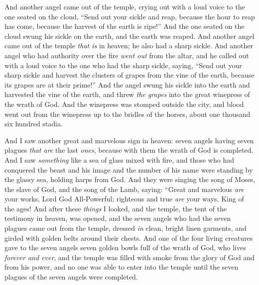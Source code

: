 \begin{biblechapter}
\verse And another angel came out of the temple, crying out with a loud voice to the one seated on the cloud, “Send out your sickle and reap, because the hour to reap has come, because the harvest of the earth is ripe!”
\verse And the one seated on the cloud swung his sickle on the earth, and the earth was reaped.
\verse And another angel came out of the temple \textit{that is} in heaven; he also had a sharp sickle.
\verse And another angel who had authority over the fire \textit{went out} from the altar, and he called out with a loud voice to the one who had the sharp sickle, saying, “Send out your sharp sickle and harvest the clusters of grapes from the vine of the earth, because its grapes are at their prime!”
\verse And the angel swung his sickle into the earth and harvested the vine of the earth, and threw \textit{the grapes} into the great winepress of the wrath of God.
\verse And the winepress was stomped outside the city, and blood went out from the winepress up to the bridles of the horses, about one thousand six hundred stadia.
\end{biblechapter}

\begin{biblechapter} %
 And I saw another great and marvelous sign in heaven: seven angels having seven plagues \textit{that are} the last \textit{ones}, because with them the wrath of God is completed.
\verse And I saw \textit{something} like a sea of glass mixed with fire, and those who had conquered the beast and his image and the number of his name were standing by the glassy sea, holding harps from God.
\verse And they were singing the song of Moses, the slave of God, and the song of the Lamb, saying:
\verse “Great and marvelous \textit{are} your works, 
Lord God All-Powerful; 
righteous and true \textit{are} your ways, 
King of the ages!
\verse And after these \textit{things} I looked, and the temple, the tent of the testimony in heaven, was opened,
\verse and the seven angels who had the seven plagues came out from the temple, dressed \textit{in} clean, bright linen garments, and girded with golden belts around their chests.
\verse And one of the four living creatures gave to the seven angels seven golden bowls full of the wrath of God, who lives \textit{forever and ever},
\verse and the temple was filled with smoke from the glory of God and from his power, and no one was able to enter into the temple until the seven plagues of the seven angels were completed.
\end{biblechapter}

